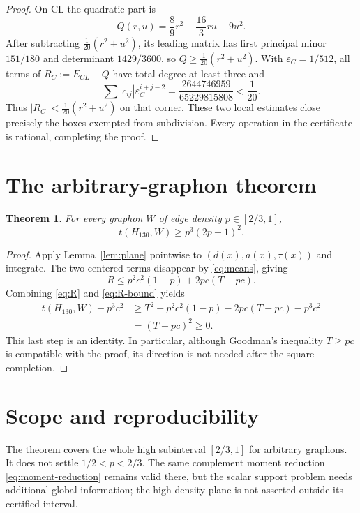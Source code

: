 \documentclass[11pt]{article}
\newtheorem{theorem}{Theorem}[section]
\begin{document}
\begin{proof}
On CL the quadratic part is
\[
 Q(r,u)=\frac89r^2-\frac{16}{3}ru+9u^2.
\]
After subtracting $\frac1{20}(r^2+u^2)$, its leading matrix has first
principal minor $151/180$ and determinant $1429/3600$, so
$Q\geq\frac1{20}(r^2+u^2)$.  With
$\varepsilon_C=1/512$, all terms of $R_C:=E_{CL}-Q$ have total degree at
least three and
\begin{equation}
 \sum |c_{ij}|\varepsilon_C^{i+j-2}
 =\frac{2644746959}{65229815808}<\frac1{20}.
 \label{eq:C-loss}
\end{equation}
Thus $|R_C|<\frac1{20}(r^2+u^2)$ on that corner.  These two local estimates
close precisely the boxes exempted from subdivision.  Every operation in
the certificate is rational, completing the proof.
\end{proof}

\section{The arbitrary-graphon theorem}

\begin{theorem}\label{thm:main}
For every graphon $W$ of edge density $p\in[2/3,1]$,
\[
 \boxed{t(H_{130},W)\geq p^3(2p-1)^2.}
\]
\end{theorem}

\begin{proof}
Apply Lemma~\ref{lem:plane} pointwise to
$(d(x),a(x),\tau(x))$ and integrate.  The two centered terms disappear by
\eqref{eq:means}, giving
\begin{equation}
 R\leq p^2c^2(1-p)+2pc(T-pc).
 \label{eq:R-bound}
\end{equation}
Combining \eqref{eq:R} and \eqref{eq:R-bound} yields
\begin{align*}
 t(H_{130},W)-p^3c^2
 &\geq T^2-p^2c^2(1-p)-2pc(T-pc)-p^3c^2\\
 &=(T-pc)^2\geq0.
\end{align*}
This last step is an identity.  In particular, although Goodman's inequality
$T\geq pc$ is compatible with the proof, its direction is not needed after
the square completion.
\end{proof}

\section{Scope and reproducibility}

The theorem covers the whole high subinterval $[2/3,1]$ for arbitrary
graphons.  It does not settle $1/2<p<2/3$.  The same complement moment
reduction \eqref{eq:moment-reduction} remains valid there, but the scalar
support problem needs additional global information; the high-density plane
is not asserted outside its certified interval.
\end{document}
